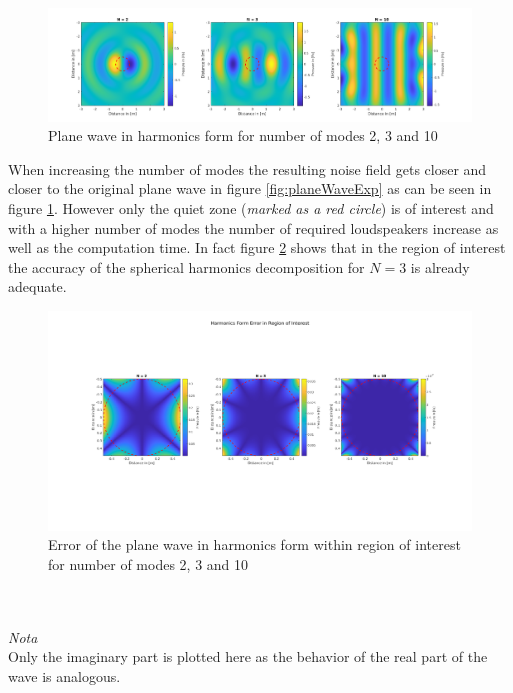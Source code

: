 \begin{figure}
    \centerline{\includegraphics[width=\paperwidth]{LaTeX/images/plots/Plane_wave_harmonics_form.png}}
    \caption{Plane wave in harmonics form for number of modes 2, 3 and 10}
    \label{fig:planeWaveHarmonics}
\end{figure}
When increasing the number of modes the resulting noise field gets closer and closer to the original plane wave in figure \ref{fig:planeWaveExp} as can be seen in figure \ref{fig:planeWaveHarmonics}. However only the quiet zone (\textit{marked as a red circle}) is of interest and with a higher number of modes the number of required loudspeakers increase as well as the computation time. In fact figure \ref{fig:planeWaveHarmonicsError} shows that in the region of interest the accuracy of the spherical harmonics decomposition for $N = 3$ is already adequate.
\begin{figure}
    \centerline{\includegraphics[width=\paperwidth]{LaTeX/images/plots/Plane_wave_harmonics_form_Error.png}}
    \caption{Error of the plane wave in harmonics form within region of interest for number of modes 2, 3 and 10}
    \label{fig:planeWaveHarmonicsError}
\end{figure}
\\
\\
\textit{Nota}\\
Only the imaginary part is plotted here as the behavior of the real part of the wave is analogous.
